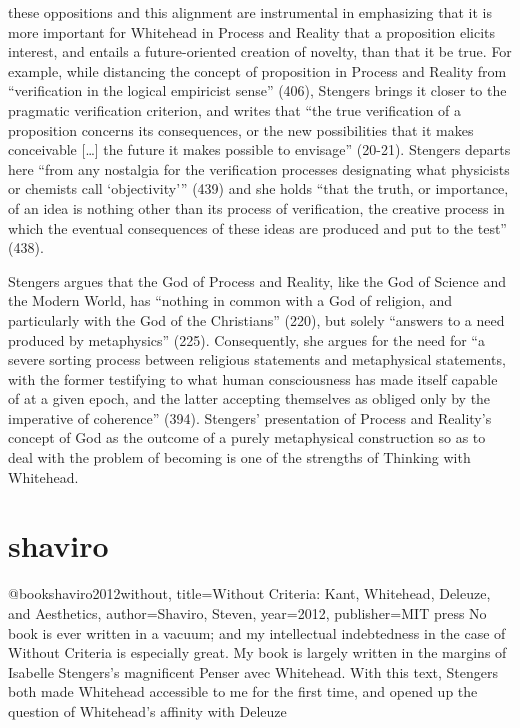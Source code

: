 \documentclass[a4paper]{Thesis}
\begin{document}
these oppositions and this alignment are instrumental in emphasizing that it is
more important for Whitehead in Process and Reality that a proposition elicits
interest, and entails a future-oriented creation of novelty, than that it be true.
For
example, while distancing the concept of proposition in Process and Reality from
“verification in the logical empiricist sense” (406), Stengers brings it closer to the
pragmatic verification criterion, and writes that “the true verification of a proposition
concerns its consequences, or the new possibilities that it makes conceivable […] the
future it makes possible to envisage” (20-21).
Stengers departs here “from any
nostalgia for the verification processes designating what physicists or chemists call
‘objectivity’” (439) and she holds “that the truth, or importance, of an idea is nothing
other than its process of verification, the creative process in which the eventual
consequences of these ideas are produced and put to the test” (438).

Stengers
argues that the God of Process and Reality, like the God of Science and the Modern
World, has “nothing in common with a God of religion, and particularly with the God
of the Christians” (220), but solely “answers to a need produced by metaphysics”
(225). Consequently, she argues for the need for “a severe sorting process between
religious statements and metaphysical statements, with the former testifying to what
human consciousness has made itself capable of at a given epoch, and the latter
accepting themselves as obliged only by the imperative of coherence” (394).
Stengers’ presentation of Process and Reality’s concept of God as the outcome of a
purely metaphysical construction so as to deal with the problem of becoming is one of
the strengths of Thinking with Whitehead.

\section{shaviro}
@book{shaviro2012without,
	title={Without Criteria: Kant, Whitehead, Deleuze, and Aesthetics},
	author={Shaviro, Steven},
	year={2012},
	publisher={MIT press}
}
No book is ever written in a vacuum; and my intellectual indebtedness
in the case of Without Criteria is especially great. My book is largely written in
the margins of Isabelle Stengers’s magnificent Penser avec Whitehead. With this
text, Stengers both made Whitehead accessible to me for the first time, and
opened up the question of Whitehead’s affinity with Deleuze
\end{document}
